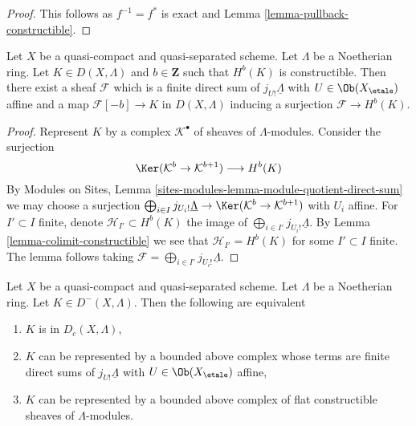 \begin{proof}
This follows as $f^{-1} = f^*$ is exact and
Lemma \ref{lemma-pullback-constructible}.
\end{proof}

\begin{lemma}
\label{lemma-one-constructible}
Let $X$ be a quasi-compact and quasi-separated scheme.
Let $\Lambda$ be a Noetherian ring. Let $K \in D(X, \Lambda)$
and $b \in \mathbf{Z}$ such that $H^b(K)$ is constructible.
Then there exist a sheaf $\mathcal{F}$ which is a finite direct sum
of $j_{U!}\underline{\Lambda}$ with $U \in \Ob(X_\etale)$ affine and
a map $\mathcal{F}[-b] \to K$ in $D(X, \Lambda)$
inducing a surjection $\mathcal{F} \to H^b(K)$.
\end{lemma}

\begin{proof}
Represent $K$ by a complex $\mathcal{K}^\bullet$ of sheaves of
$\Lambda$-modules. Consider the surjection
$$
\Ker(\mathcal{K}^b \to \mathcal{K}^{b + 1})
\longrightarrow
H^b(K)
$$
By Modules on Sites, Lemma
\ref{sites-modules-lemma-module-quotient-direct-sum}
we may choose a surjection
$\bigoplus_{i \in I} j_{U_i!} \underline{\Lambda} \to
\Ker(\mathcal{K}^b \to \mathcal{K}^{b + 1})$
with $U_i$ affine. For $I' \subset I$ finite, denote
$\mathcal{H}_{I'} \subset H^b(K)$ the image of
$\bigoplus_{i \in I'} j_{U_i!} \underline{\Lambda}$.
By Lemma \ref{lemma-colimit-constructible} we see that
$\mathcal{H}_{I'} = H^b(K)$ for some $I' \subset I$ finite.
The lemma follows taking
$\mathcal{F} = \bigoplus_{i \in I'} j_{U_i!} \underline{\Lambda}$.
\end{proof}

\begin{lemma}
\label{lemma-bounded-above-c}
Let $X$ be a quasi-compact and quasi-separated scheme.
Let $\Lambda$ be a Noetherian ring. Let $K \in D^-(X, \Lambda)$. Then
the following are equivalent
\begin{enumerate}
\item $K$ is in $D_c(X, \Lambda)$,
\item $K$ can be represented by a bounded above complex
whose terms are finite direct sums of $j_{U!}\underline{\Lambda}$
with $U \in \Ob(X_\etale)$ affine,
\item $K$ can be represented by a bounded above complex
of flat constructible sheaves of $\Lambda$-modules.
\end{enumerate}
\end{lemma}


